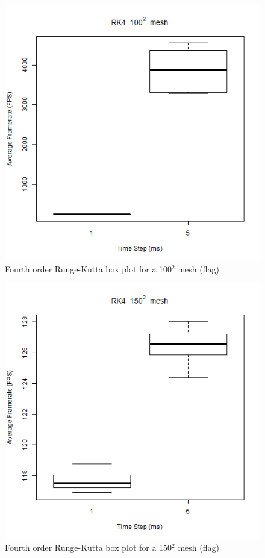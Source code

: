       \begin{figure}
    \begin{center}
      \includegraphics[scale=.9]{Figures/flag_rk4_100_box}
    \end{center}
    \caption{Fourth order Runge-Kutta box plot for a 100$^{2}$ mesh (flag)}
    \label{fig:rk4 box 100 flag}
  \end{figure}
  
      \begin{figure}
    \begin{center}
      \includegraphics[scale=.9]{Figures/flag_rk4_150_box}
    \end{center}
    \caption{Fourth order Runge-Kutta box plot for a 150$^{2}$ mesh (flag)}
    \label{fig:rk4 box 150 flag}
  \end{figure}
  
